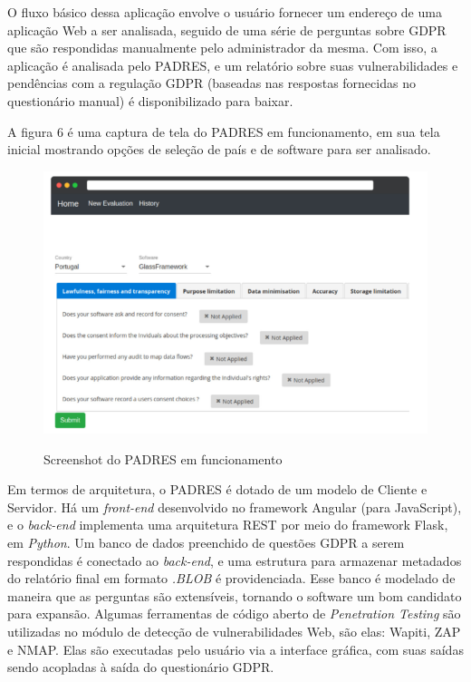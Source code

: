 O fluxo básico dessa aplicação envolve o usuário fornecer um endereço de uma aplicação Web a ser analisada, seguido de uma série de perguntas sobre GDPR que são respondidas manualmente pelo administrador da mesma. Com isso, a aplicação é analisada pelo PADRES, e um relatório sobre suas vulnerabilidades e pendências com a regulação GDPR (baseadas nas respostas fornecidas no questionário manual) é disponibilizado para baixar. 

A figura 6 é uma captura de tela do PADRES em funcionamento, em sua tela inicial mostrando opções de seleção de país e de software para ser analisado.

\begin{figure}[ht]
    \centering
    \caption{Screenshot do PADRES em funcionamento}
    \includegraphics[width=14cm]{figuras/padres.png} 
    \label{fig:internet} 
\end{figure}

Em termos de arquitetura, o PADRES é dotado de um modelo de Cliente e Servidor. Há um \textit{front-end} desenvolvido no framework Angular (para JavaScript), e o \textit{back-end} implementa uma arquitetura REST por meio do framework Flask, em \textit{Python}. Um banco de dados preenchido de questões GDPR a serem respondidas é conectado ao \textit{back-end}, e uma estrutura para armazenar metadados do relatório final em formato \textit{.BLOB} é providenciada. Esse banco é modelado de maneira que as perguntas são extensíveis, tornando o software um bom candidato para expansão. Algumas ferramentas de código aberto de \textit{Penetration Testing} são utilizadas no módulo de detecção de vulnerabilidades Web, são elas: Wapiti, ZAP e NMAP. Elas são executadas pelo usuário via a interface gráfica, com suas saídas sendo acopladas à saída do questionário GDPR.

